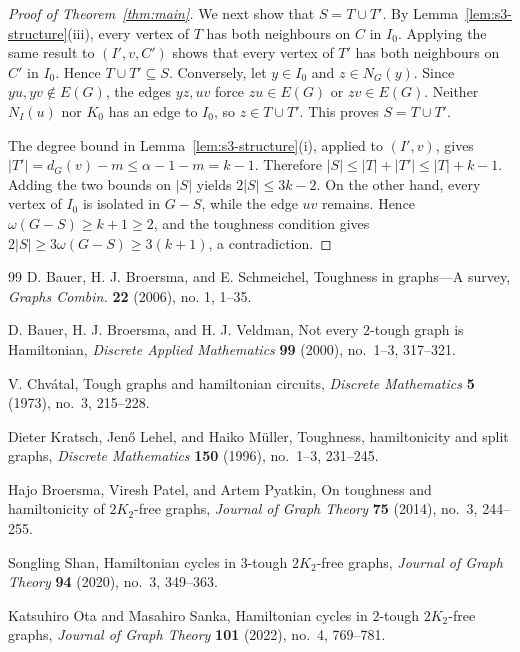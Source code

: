 \documentclass[11pt]{article}
\numberwithin{equation}{section}
\theoremstyle{plain}
\theoremstyle{definition}
\theoremstyle{plain}
\begin{document}
\begin{proof}[Proof of Theorem~\ref{thm:main}]
We next show that $S=T\cup T'$.
By Lemma~\ref{lem:s3-structure}\textup{(iii)}, every vertex of $T$
has both neighbours on $C$ in $I_0$.
Applying the same result to $(I',v,C')$ shows that every vertex of
$T'$ has both neighbours on $C'$ in $I_0$.
Hence $T\cup T'\subseteq S$.
Conversely, let $y\in I_0$ and $z\in N_G(y)$.
Since $yu,yv\notin E(G)$, the edges $yz,uv$ force
$zu\in E(G)$ or $zv\in E(G)$.
Neither $N_I(u)$ nor $K_0$ has an edge to $I_0$, so
$z\in T\cup T'$.
This proves $S=T\cup T'$.

The degree bound in Lemma~\ref{lem:s3-structure}\textup{(i)},
applied to $(I',v)$, gives
$|T'|=d_G(v)-m\leq\alpha-1-m=k-1$.
Therefore
$ |S|\leq |T|+|T'|\leq |T|+k-1$.
Adding the two bounds on $|S|$ yields $2|S|\leq3k-2$.
On the other hand, every vertex of $I_0$ is isolated in $G-S$,
while the edge $uv$ remains.
Hence $\omega(G-S)\geq k+1\geq2$, and the toughness condition gives
$
 2|S|\geq3\omega(G-S)\geq3(k+1)$,
a contradiction.
\end{proof}





\begin{thebibliography}{99}
D. Bauer, H. J. Broersma, and E. Schmeichel, Toughness in graphs---A survey, \emph{Graphs Combin.} \textbf{22} (2006), no. 1, 1--35.

D. Bauer, H. J. Broersma, and H. J. Veldman, Not every $2$-tough graph is Hamiltonian, \emph{Discrete Applied Mathematics} \textbf{99} (2000), no.~1--3, 317--321.



V. Chv{\'a}tal, Tough graphs and hamiltonian circuits, \emph{Discrete Mathematics} \textbf{5} (1973), no.~3, 215--228.


Dieter Kratsch, Jen{\H o} Lehel, and Haiko M{\"u}ller, Toughness, hamiltonicity and split graphs, \emph{Discrete Mathematics} \textbf{150} (1996), no.~1--3, 231--245.

Hajo Broersma, Viresh Patel, and Artem Pyatkin, On toughness and hamiltonicity of {$2K_2$}-free graphs, \emph{Journal of Graph Theory} \textbf{75} (2014), no.~3, 244--255.

Songling Shan, {Hamiltonian} cycles in {$3$}-tough {$2K_2$}-free graphs, \emph{Journal of Graph Theory} \textbf{94} (2020), no.~3, 349--363.

Katsuhiro Ota and Masahiro Sanka, {Hamiltonian} cycles in {$2$}-tough {$2K_2$}-free graphs, \emph{Journal of Graph Theory} \textbf{101} (2022), no.~4, 769--781.



\end{thebibliography}
\end{document}
